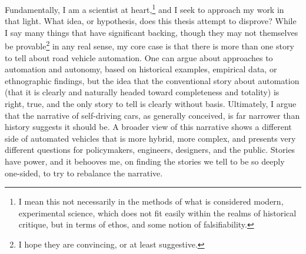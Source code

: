 Fundamentally, I am a scientist at heart,\footnote{I mean this not necessarily in
  the methods of what is considered modern, experimental science,
  which does not fit easily within the realms of historical critique,
  but in terms of ethos, and some notion of falsifiability.} and I seek to approach my
work in that light. What idea, or hypothesis, does this thesis attempt
to disprove? While I say many things that have significant backing,
though they may not themselves be provable\footnote{I hope they are
  convincing, or at least suggestive.} in any real sense, my core case
is that there is more than one story to tell about road vehicle
automation. One can argue about approaches to automation and autonomy,
based on historical examples, empirical data, or ethnographic
findings, but the idea that the conventional story about automation
(that it is clearly and naturally headed toward completeness and
totality) is right, true, and the only story to tell is clearly
without basis. Ultimately, I argue that the narrative of self-driving cars, as
generally conceived, is far narrower than history suggests it should
be. A broader view of this narrative shows a different side of
automated vehicles that is more hybrid, more complex, and presents
very different questions for policymakers, engineers, designers, and
the public. Stories have power, and it
behooves me, on finding the stories we tell to be so deeply one-sided,
to try to rebalance the narrative.


